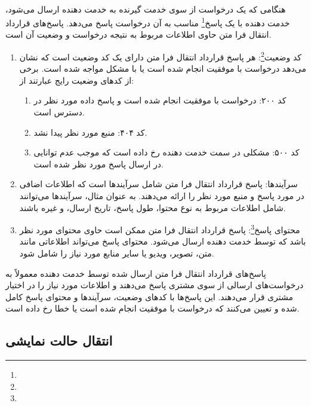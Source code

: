\paragraph{}
{
    هنگامی که یک درخواست از سوی خدمت گیرنده به خدمت دهنده‌ ارسال می‌شود، خدمت دهنده‌ با یک پاسخ\footnote{} مناسب به آن درخواست پاسخ می‌دهد. پاسخ‌های قرارداد انتقال فرا متن حاوی اطلاعات مربوط به نتیجه درخواست و وضعیت آن است.
    \begin{enumerate}
        \item کد وضعیت\footnote{}: هر پاسخ قرارداد انتقال فرا متن دارای یک کد وضعیت است که نشان می‌دهد درخواست با موفقیت انجام شده است یا با مشکل مواجه شده است. برخی از کدهای وضعیت رایج عبارتند از:
        \begin{enumerate}
            \item کد ۲۰۰: درخواست با موفقیت انجام شده است و پاسخ داده مورد نظر در دسترس است.
            \item کد ۴۰۴: منبع مورد نظر پیدا نشد.
            \item کد ۵۰۰: مشکلی در سمت خدمت دهنده‌ رخ داده است که موجب عدم توانایی در ارسال پاسخ مورد نظر شده است.
        \end{enumerate}
        \item سرآیندها: پاسخ قرارداد انتقال فرا متن شامل سرآیندها است که اطلاعات اضافی در مورد پاسخ و منبع مورد نظر را ارائه می‌دهند. به عنوان مثال، سرآیندها می‌توانند شامل اطلاعات مربوط به نوع محتوا، طول پاسخ، تاریخ ارسال، و غیره باشند.
        \item محتوای پاسخ\footnote{}: پاسخ قرارداد انتقال فرا متن ممکن است حاوی محتوای مورد نظر باشد که توسط خدمت دهنده‌ ارسال می‌شود. محتوای پاسخ می‌تواند اطلاعاتی مانند متن، تصویر، ویدیو یا سایر منابع مورد نیاز را شامل شود.
    \end{enumerate}
    پاسخ‌های قرارداد انتقال فرا متن ارسال شده توسط خدمت دهنده‌ معمولاً به درخواست‌های ارسالی از سوی مشتری پاسخ می‌دهند و اطلاعات مورد نیاز را در اختیار مشتری قرار می‌دهند. این پاسخ‌ها با کدهای وضعیت، سرآیندها و محتوای پاسخ کامل شده و تعیین می‌کنند که درخواست با موفقیت انجام شده است یا خطا رخ داده است.
}

\subsection{انتقال حالت نمایشی}
\label{subsec:rest}
